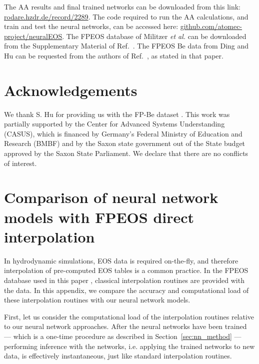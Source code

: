 \documentclass[%
 preprint,
 superscriptaddress,
 amsmath,amssymb,
longbibliography,
]{revtex4-2}
\begin{document}
The AA results and final trained networks can be downloaded from this link: \href{https://rodare.hzdr.de/record/2289}{rodare.hzdr.de/record/2289}. The code required to run the AA calculations, and train and test the neural networks, can be accessed here: \href{https://github.com/atomec-project/neuralEOS}{github.com/atomec-project/neuralEOS}. The FPEOS database of Militzer \emph{et al.} can be downloaded from the Supplementary Material of Ref.~. The FPEOS Be data from Ding and Hu can be requested from the authors of Ref.~\cite{Hu_Be_EOS}, as stated in that paper.

\section*{Acknowledgements}

We thank S. Hu for providing us with the FP-Be dataset \cite{Hu_Be_EOS}. This work
was partially supported by the Center for Advanced Systems
Understanding (CASUS), which is financed by Germany’s
Federal Ministry of Education and Research (BMBF) and by
the Saxon state government out of the State budget approved
by the Saxon State Parliament.
We declare that there are no conflicts of interest.

\appendix
\section{Comparison of neural network models with FPEOS direct interpolation}\label{app:interp_comp}

In hydrodynamic simulations, EOS data is required on-the-fly, and therefore interpolation of pre-computed EOS tables is a common practice. In the FPEOS database used in this paper \cite{Militzer_EOS_database}, classical interpolation routines are provided with the data. In this appendix, we compare the accuracy and computational load of these interpolation routines with our neural network models.

First, let us consider the computational load of the interpolation routines relative to our neural network approaches. After the neural networks have been trained --- which is a one-time procedure as described in Section~\ref{sec:nn_method} --- performing inference with the networks, i.e. applying the trained networks to new data, is effectively instantaneous, just like standard interpolation routines.
\end{document}
